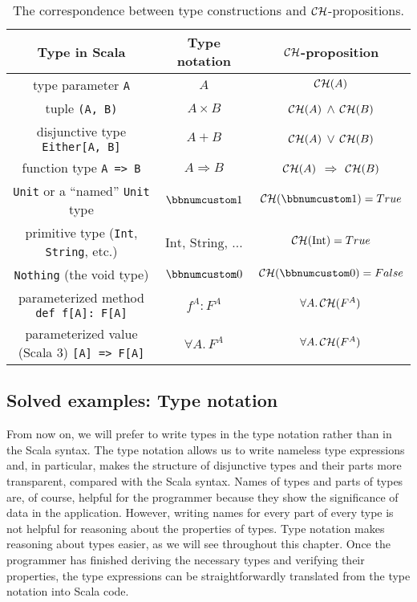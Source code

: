 \begin{table}
\begin{centering}
\begin{tabular}{|c|c|c|}
\hline 
\textbf{\small{}Type in Scala} & \textbf{\small{}Type notation} & \textbf{\small{}${\cal CH}$-proposition}\tabularnewline
\hline 
\hline 
{\small{}type parameter} \lstinline!A! & $A$ & ${\cal CH}(A)$\tabularnewline
\hline 
{\small{}tuple} \lstinline!(A, B)! & $A\times B$ & ${\cal CH}(A)$ $\wedge$ ${\cal CH}(B)$\tabularnewline
\hline 
{\small{}disjunctive type} \lstinline!Either[A, B]! & $A+B$ & ${\cal CH}(A)$ $\vee$ ${\cal CH}(B)$\tabularnewline
\hline 
{\small{}function type} \lstinline!A => B! & $A\Rightarrow B$ & ${\cal CH}(A)$ $\Rightarrow$ ${\cal CH}(B)$\tabularnewline
\hline 
\lstinline!Unit! {\small{}or a ``named''} \lstinline!Unit! {\small{}type} & $\bbnum 1$ & ${\cal CH}(\bbnum 1)=True$\tabularnewline
\hline 
{\small{}primitive type (}\lstinline!Int!{\small{}, }\lstinline!String!{\small{},
etc.)} & {\small{}$\text{Int}$, $\text{String}$, ...} & ${\cal CH}(\text{Int})=True$\tabularnewline
\hline 
\lstinline!Nothing! {\small{}(the void type)} & $\bbnum 0$ & ${\cal CH}(\bbnum 0)=False$\tabularnewline
\hline 
{\small{}parameterized method} \lstinline!def f[A]: F[A]! & $f^{A}:F^{A}$ & $\forall A.\,{\cal CH}(F^{A})$\tabularnewline
\hline 
{\small{}parameterized value (Scala 3)} \lstinline![A] => F[A]! & $\forall A.\,F^{A}$ & $\forall A.\,{\cal CH}(F^{A})$\tabularnewline
\hline 
\end{tabular}
\par\end{centering}
\caption{The correspondence between type constructions and ${\cal CH}$-propositions.\label{tab:ch-correspondence-type-notation-CH-propositions}}
\end{table}


\subsection{Solved examples: Type notation}

From now on, we will prefer to write types in the type notation rather
than in the Scala syntax. The type notation allows us to write nameless
type expressions and, in particular, makes the structure of disjunctive
types and their parts more transparent, compared with the Scala syntax.
Names of types and parts of types are, of course, helpful for the
programmer because they show the significance of data in the application.
However, writing names for every part of every type is not helpful
for reasoning about the properties of types. Type notation makes reasoning
about types easier, as we will see throughout this chapter. Once the
programmer has finished deriving the necessary types and verifying
their properties, the type expressions can be straightforwardly translated
from the type notation into Scala code.

